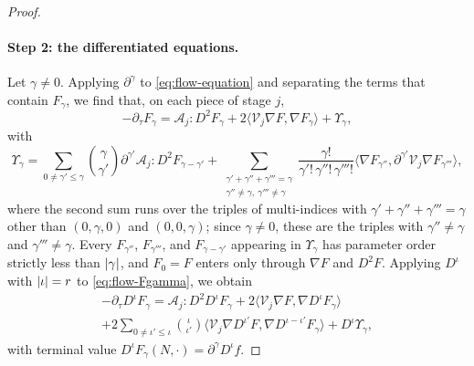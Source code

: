 \begin{proof}
\paragraph{Step 2: the differentiated equations.} Let $\gamma\ne0$. Applying
$\partial^\gamma$ to \eqref{eq:flow-equation} and separating the terms that
contain $F_\gamma$, we find that, on each piece of stage $j$,
\begin{equation}\label{eq:flow-Fgamma}
 -\partial_\tau F_\gamma=\mathcal A_j\mathbin{:}D^2F_\gamma
 +2\langle\mathcal V_j\nabla F,\nabla F_\gamma\rangle+\Upsilon_\gamma,
\end{equation}
with
\begin{equation}\label{eq:flow-Ugamma}
 \Upsilon_\gamma=\sum_{0\ne\gamma'\le\gamma}\binom{\gamma}{\gamma'}
 \partial^{\gamma'}\!\mathcal A_j\mathbin{:}D^2F_{\gamma-\gamma'}
 +\sum_{\substack{\gamma'+\gamma''+\gamma'''=\gamma\\ \gamma''\ne\gamma,\ \gamma'''\ne\gamma}}
 \frac{\gamma!}{\gamma'!\,\gamma''!\,\gamma'''!}
 \bigl\langle\nabla F_{\gamma''},\partial^{\gamma'}\!\mathcal V_j\nabla F_{\gamma'''}\bigr\rangle,
\end{equation}
where the second sum runs over the triples of multi-indices with
$\gamma'+\gamma''+\gamma'''=\gamma$ other than $(0,\gamma,0)$ and $(0,0,\gamma)$; since
$\gamma\ne0$, these are the triples with $\gamma''\ne\gamma$ and $\gamma'''\ne\gamma$.
Every $F_{\gamma''}$, $F_{\gamma'''}$, and $F_{\gamma-\gamma'}$ appearing in
$\Upsilon_\gamma$ has parameter order strictly less than $\lvert \gamma\rvert$, and
$F_0=F$ enters only through $\nabla F$ and $D^2F$. Applying $D^\iota$ with
$\lvert \iota\rvert=r$ to \eqref{eq:flow-Fgamma}, we obtain
\begin{multline}\label{eq:flow-Fgamma-iota}
 -\partial_\tau D^\iota F_\gamma=\mathcal A_j\mathbin{:}D^2D^\iota F_\gamma
 +2\langle\mathcal V_j\nabla F,\nabla D^\iota F_\gamma\rangle\\
 +2\sum_{0\ne\iota'\le\iota}\binom{\iota}{\iota'}
 \bigl\langle\mathcal V_j\nabla D^{\iota'}F,\nabla D^{\iota-\iota'}F_\gamma\bigr\rangle
 +D^\iota\Upsilon_\gamma,
\end{multline}
with terminal value $D^\iota F_\gamma(N,\cdot)=\partial^\gamma D^\iota f$.


\end{proof}
